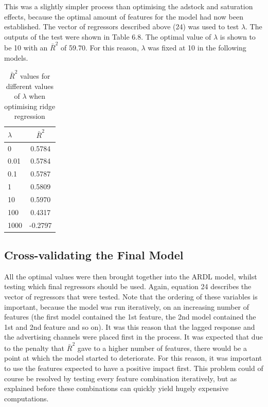 \documentclass[11pt, a4paper]{article}
\begin{document}
This was a slightly simpler process than optimising the adstock and saturation effects, because the optimal amount of features for the model had now been established. The vector of regressors described above (24) was used to test $\lambda$. The outputs of the test were shown in Table 6.8. The optimal value of $\lambda$ is shown to be 10 with an $\bar{R}^2$ of 59.70. For this reason, $\lambda$ was fixed at 10 in the following models.
\begin{table}[h!]
    \centering
    \begin{tabular}{lc}
        \toprule
        \textbf{$\lambda$} & \textbf{$\bar{R}^2$} \\
        \midrule
        0     & 0.5784 \\
        0.01  & 0.5784 \\
        0.1   & 0.5787 \\
        1     & 0.5809 \\
        10    & 0.5970 \\
        100   & 0.4317 \\
        1000  & -0.2797 \\
        \bottomrule
    \end{tabular}
    \caption{$\bar{R}^2$ values for different values of $\lambda$ when optimising ridge regression}
    \label{tab:lambda_r2}
\end{table}

\subsection{Cross-validating the Final Model}
All the optimal values were then brought together into the ARDL model, whilst testing which final regressors should be used. Again, equation 24 describes the vector of regressors that were tested. 
Note that the ordering of these variables is important, because the model was run iteratively, on an increasing number of features (the first model contained the 1st feature, the 2nd model contained the 1st and 2nd feature and so on). It was this reason that the lagged response and the advertising channels were placed first in the process. It was expected that due to the penalty that $\bar{R}^2$ gave to a higher number of features, there would be a point at which the model started to deteriorate. For this reason, it was important to use the features expected to have a positive impact first. This problem could of course be resolved by testing every feature combination iteratively, but as explained before these combinations can quickly yield hugely expensive computations. 
\end{document}
